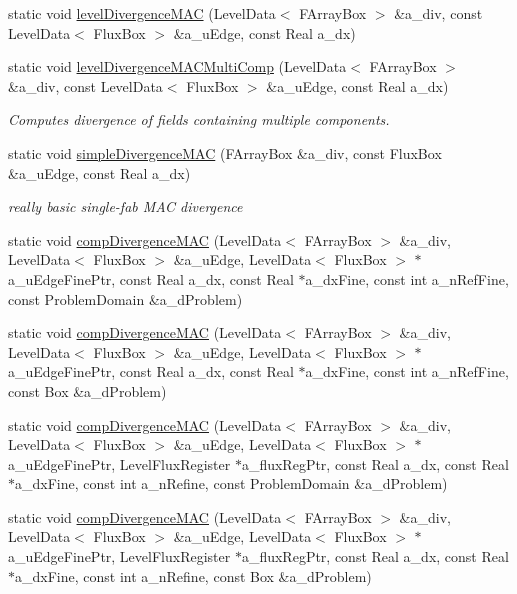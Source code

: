 \begin{DoxyCompactItemize}
\item 
static void \hyperlink{class_divergence_a9004d4f62127cfaecab354769b4fcd58}{level\-Divergence\-M\-A\-C} (Level\-Data$<$ F\-Array\-Box $>$ \&a\-\_\-div, const Level\-Data$<$ Flux\-Box $>$ \&a\-\_\-u\-Edge, const Real a\-\_\-dx)
\item 
static void \hyperlink{class_divergence_a6e222e89a13a45cbc06f380302aebf13}{level\-Divergence\-M\-A\-C\-Multi\-Comp} (Level\-Data$<$ F\-Array\-Box $>$ \&a\-\_\-div, const Level\-Data$<$ Flux\-Box $>$ \&a\-\_\-u\-Edge, const Real a\-\_\-dx)
\begin{DoxyCompactList}\small\item\em Computes divergence of fields containing multiple components. \end{DoxyCompactList}\item 
\hypertarget{class_divergence_acc40ffe25f3b5a7eeb35cfab48873180}{static void \hyperlink{class_divergence_acc40ffe25f3b5a7eeb35cfab48873180}{simple\-Divergence\-M\-A\-C} (F\-Array\-Box \&a\-\_\-div, const Flux\-Box \&a\-\_\-u\-Edge, const Real a\-\_\-dx)}\label{class_divergence_acc40ffe25f3b5a7eeb35cfab48873180}

\begin{DoxyCompactList}\small\item\em really basic single-\/fab M\-A\-C divergence \end{DoxyCompactList}\item 
static void \hyperlink{class_divergence_acd62afebbe823676309ba7301578ea96}{comp\-Divergence\-M\-A\-C} (Level\-Data$<$ F\-Array\-Box $>$ \&a\-\_\-div, Level\-Data$<$ Flux\-Box $>$ \&a\-\_\-u\-Edge, Level\-Data$<$ Flux\-Box $>$ $\ast$a\-\_\-u\-Edge\-Fine\-Ptr, const Real a\-\_\-dx, const Real $\ast$a\-\_\-dx\-Fine, const int a\-\_\-n\-Ref\-Fine, const Problem\-Domain \&a\-\_\-d\-Problem)
\item 
static void \hyperlink{class_divergence_ab223946c8b00bee70b0f73530ef274fe}{comp\-Divergence\-M\-A\-C} (Level\-Data$<$ F\-Array\-Box $>$ \&a\-\_\-div, Level\-Data$<$ Flux\-Box $>$ \&a\-\_\-u\-Edge, Level\-Data$<$ Flux\-Box $>$ $\ast$a\-\_\-u\-Edge\-Fine\-Ptr, const Real a\-\_\-dx, const Real $\ast$a\-\_\-dx\-Fine, const int a\-\_\-n\-Ref\-Fine, const Box \&a\-\_\-d\-Problem)
\item 
static void \hyperlink{class_divergence_a7ea9ccc4a12abac5f0141e67c69f9c0f}{comp\-Divergence\-M\-A\-C} (Level\-Data$<$ F\-Array\-Box $>$ \&a\-\_\-div, Level\-Data$<$ Flux\-Box $>$ \&a\-\_\-u\-Edge, Level\-Data$<$ Flux\-Box $>$ $\ast$a\-\_\-u\-Edge\-Fine\-Ptr, Level\-Flux\-Register $\ast$a\-\_\-flux\-Reg\-Ptr, const Real a\-\_\-dx, const Real $\ast$a\-\_\-dx\-Fine, const int a\-\_\-n\-Refine, const Problem\-Domain \&a\-\_\-d\-Problem)
\item 
static void \hyperlink{class_divergence_a6edc8c244f67ac7fcaf54386a1fed40b}{comp\-Divergence\-M\-A\-C} (Level\-Data$<$ F\-Array\-Box $>$ \&a\-\_\-div, Level\-Data$<$ Flux\-Box $>$ \&a\-\_\-u\-Edge, Level\-Data$<$ Flux\-Box $>$ $\ast$a\-\_\-u\-Edge\-Fine\-Ptr, Level\-Flux\-Register $\ast$a\-\_\-flux\-Reg\-Ptr, const Real a\-\_\-dx, const Real $\ast$a\-\_\-dx\-Fine, const int a\-\_\-n\-Refine, const Box \&a\-\_\-d\-Problem)
\end{DoxyCompactItemize}


